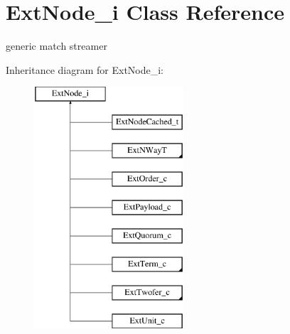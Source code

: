 \hypertarget{classExtNode__i}{\section{Ext\-Node\-\_\-i Class Reference}
\label{classExtNode__i}
}


generic match streamer  


Inheritance diagram for Ext\-Node\-\_\-i\-:\begin{figure}[H]
\begin{center}
\leavevmode
\includegraphics[height=9.000000cm]{classExtNode__i}
\end{center}
\end{figure}
